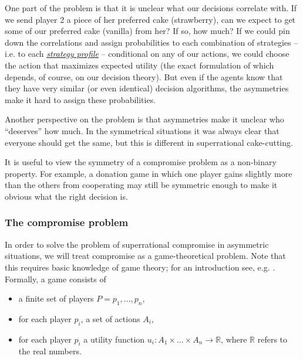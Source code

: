 One part of the problem is that it is unclear what our decisions
correlate with. If we send player 2 a piece of her preferred cake
(strawberry), can we expect to get some of our preferred cake (vanilla)
from her? If so, how much? If we could pin down the correlations and
assign probabilities to each combination of strategies -- i.e. to each
\href{https://en.wikipedia.org/wiki/Strategy_(game_theory)}{\emph{strategy
profile}} -- conditional on any of our actions, we could choose the
action that maximizes expected utility (the exact formulation of which
depends, of course, on our decision theory). But even if the agents know
that they have very similar (or even identical) decision algorithms, the
asymmetries make it hard to assign these probabilities.

Another perspective on the problem is that asymmetries make it unclear
who ``deserves'' how much. In the symmetrical situations it was always
clear that everyone should get the same, but this is different in
superrational cake-cutting.

It is useful to view the symmetry of a compromise problem as a
non-binary property. For example, a donation game in which one player
gains slightly more than the others from cooperating may still be
symmetric enough to make it obvious what the right decision is.

\hypertarget{the-compromise-problem}{\subsubsection{The compromise
problem}\label{the-compromise-problem}}

In order to solve the problem of superrational compromise in asymmetric
situations, we will treat compromise as a game-theoretical problem. Note
that this requires basic knowledge of game theory; for an introduction
see, e.g. \parencite{Osborne2004-ui}. Formally, a game
consists of

\begin{itemize}
\item
  a finite set of players \(P = { p_{1},...,p_{n}}\),
\item
  for each player \(p_{i}\), a set of actions \(A_{i}\),
\item
  for each player \(p_{i}\) a utility function
  \(u_{i}:A_{1} \times \text{...} \times A_{n} \rightarrow \mathbb{R}\), where
  \(\mathbb{R}\) refers to the real numbers. 
\end{itemize}

